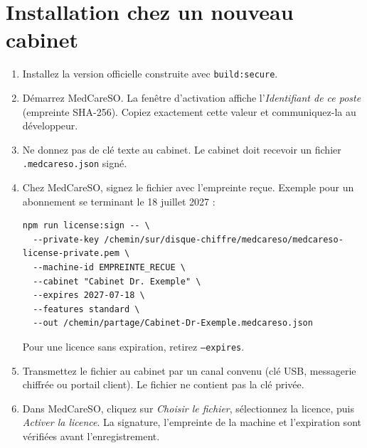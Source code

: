 \documentclass[11pt,a4paper]{article}
\begin{document}
\section{Installation chez un nouveau cabinet}
\begin{enumerate}[label=\arabic*.]
  \item Installez la version officielle construite avec \texttt{build:secure}.
  \item Démarrez MedCareSO. La fenêtre d'activation affiche l'\emph{Identifiant
  de ce poste} (empreinte SHA-256). Copiez exactement cette valeur et
  communiquez-la au développeur.
  \item Ne donnez pas de clé texte au cabinet. Le cabinet doit recevoir un
  fichier \texttt{.medcareso.json} signé.
  \item Chez MedCareSO, signez le fichier avec l'empreinte reçue. Exemple pour
  un abonnement se terminant le 18 juillet 2027 :
\begin{verbatim}
npm run license:sign -- \
  --private-key /chemin/sur/disque-chiffre/medcareso/medcareso-license-private.pem \
  --machine-id EMPREINTE_RECUE \
  --cabinet "Cabinet Dr. Exemple" \
  --expires 2027-07-18 \
  --features standard \
  --out /chemin/partage/Cabinet-Dr-Exemple.medcareso.json
\end{verbatim}
Pour une licence sans expiration, retirez \texttt{--expires}.
  \item Transmettez le fichier au cabinet par un canal convenu (clé USB,
  messagerie chiffrée ou portail client). Le fichier ne contient pas la clé
  privée.
  \item Dans MedCareSO, cliquez sur \emph{Choisir le fichier}, sélectionnez la
  licence, puis \emph{Activer la licence}. La signature, l'empreinte de la
  machine et l'expiration sont vérifiées avant l'enregistrement.
\end{enumerate}
\end{document}
